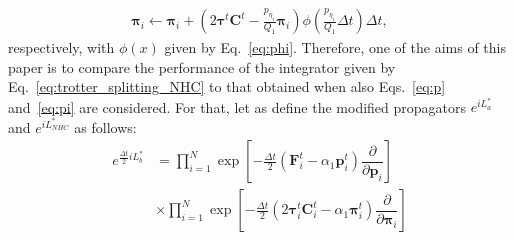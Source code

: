 \documentclass[aip,jcp,reprint,amsmath,amssymb,raggedbottom]{revtex4-1}
\newcommand{\mt}[1]{\boldsymbol{\mathbf{#1}}}           %
\newcommand{\vt}[1]{\boldsymbol{\mathbf{#1}}}           %
\newcommand{\tr}[1]{#1^t}                               %
\newcommand{\diff}[2]{\dfrac{\partial #1}{\partial #2}} %
\begin{document}
\begin{equation}
\label{eq:pi}
\begin{split}
{\vt \pi}_i \leftarrow {\vt \pi}_i + \left(2 \tr{\vt \tau} \tr{\mt C} - \frac{p_{\eta_1}}{Q_1} {\vt \pi}_i \right) \phi\left(\frac{p_{\eta_1}}{Q_1} \Delta t \right) \Delta t,
\end{split}
\end{equation}
respectively, with $\phi(x)$ given by Eq.~\ref{eq:phi}. Therefore, one of the aims of this paper is to compare the performance of the integrator given by Eq.~\ref{eq:trotter_splitting_NHC} to that obtained when also Eqs.~\ref{eq:p} and~\ref{eq:pi} are considered. For that, let as define the modified propagators $ e^{i L^\ast_a} $ and $ e^{i L^\ast_{NHC}} $ as follows:
\begin{equation}
\begin{split}
e^{\frac{\Delta t}{2} i\!L_b^\ast} &= \prod_{i=1}^N \exp\left[-\frac{\Delta t}{2} \left( \tr{\vt F}_i - \alpha_1 \tr{\vt p}_i \right) \diff{}{\vt p_i} \right] \\
&\times \prod_{i=1}^N \exp\left[-\frac{\Delta t}{2} \left(2 \tr{\vt \tau}_i \tr{\mt C}_i -  \alpha_1 \tr{\vt \pi}_i \right)  \diff{}{\vt \pi_i}   \right]
\end{split}
\end{equation}
\end{document}

